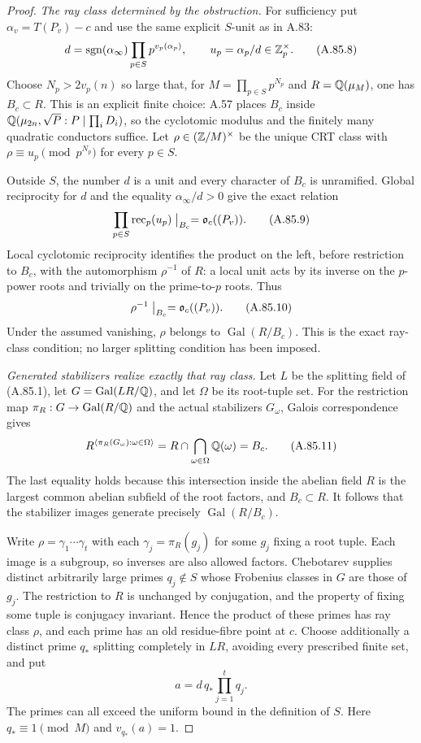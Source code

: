 \begin{proof}
\emph{The ray class determined by the obstruction.}
For sufficiency put
$\alpha_v=T(P_v)-c$ and use the same explicit $S$-unit as
in A.83:
\[
 d=\operatorname{sgn}(\alpha_\infty)
                      \prod_{p\in S}p^{v_p(\alpha_p)},\qquad
 u_p=\alpha_p/d\in\mathbb Z_p^\times .
 \tag{A.85.8}
\]
Choose $N_p>2v_p(n)$ so large that, for
$M=\prod_{p\in S}p^{N_p}$ and $R=\mathbb Q(\mu_M)$, one has
$B_c\subset R$.
This is an explicit finite choice: A.57 places $B_c$
inside $\mathbb Q(\mu_{2n},\sqrt P:P\mid\prod_i D_i)$, so the
cyclotomic modulus and the finitely many quadratic
conductors suffice.
Let $\rho\in(\mathbb Z/M)^\times$ be the unique CRT class with
$\rho\equiv u_p\pmod {p^{N_p}}$ for every $p\in S$.

Outside $S$, the number $d$ is a unit and every character
of $B_c$ is unramified.  Global reciprocity for $d$ and
the equality $\alpha_\infty/d>0$ give the exact relation
\[
 \prod_{p\in S}\operatorname{rec}_p(u_p)\bigm|_{B_c}
       =\mathfrak o_c((P_v)).
 \tag{A.85.9}
\]
Local cyclotomic reciprocity identifies the product on
the left, before restriction to $B_c$, with the automorphism
$\rho^{-1}$ of $R$: a local unit acts by its inverse on
the $p$-power roots and trivially on the prime-to-$p$ roots.
Thus
\[
              \rho^{-1}\bigm|_{B_c}=\mathfrak o_c((P_v)).
 \tag{A.85.10}
\]
Under the assumed vanishing, $\rho$ belongs to
$\operatorname{Gal}(R/B_c)$.
This is the exact ray-class condition; no larger splitting
condition has been imposed.

\emph{Generated stabilizers realize exactly that ray class.}
Let $L$ be the splitting field of (A.85.1), let
$G=\operatorname{Gal}(LR/\mathbb Q)$, and let $\Omega$ be its
root-tuple set.
For the restriction map
$\pi_R:G\to\operatorname{Gal}(R/\mathbb Q)$ and the actual
stabilizers $G_\omega$, Galois correspondence gives
\[
 R^{\langle\pi_R(G_\omega):\omega\in\Omega\rangle}
       =R\cap\bigcap_{\omega\in\Omega}\mathbb Q(\omega)=B_c.
 \tag{A.85.11}
\]
The last equality holds because this intersection inside
the abelian field $R$ is the largest common abelian
subfield of the root factors, and $B_c\subset R$.
It follows that the stabilizer images generate precisely
$\operatorname{Gal}(R/B_c)$.

Write $\rho=\gamma_1\cdots\gamma_t$ with each
$\gamma_j=\pi_R(g_j)$ for some $g_j$ fixing a root tuple.
Each image is a subgroup, so inverses are also allowed
factors.  Chebotarev supplies distinct arbitrarily large
primes $q_j\notin S$ whose Frobenius classes in $G$
are those of $g_j$.
The restriction to $R$ is unchanged by conjugation, and
the property of fixing some tuple is conjugacy invariant.
Hence the product of these primes has ray class $\rho$,
and each prime has an old residue-fibre point at $c$.
Choose additionally a distinct prime $q_*$ splitting
completely in $LR$, avoiding every prescribed finite set,
and put
\[
                          a=d\,q_*\prod_{j=1}^t q_j.
 \tag{A.85.12}
\]
The primes can all exceed the uniform bound in the
definition of $S$.
Here $q_*\equiv1\pmod M$ and $v_{q_*}(a)=1$.


\end{proof}
